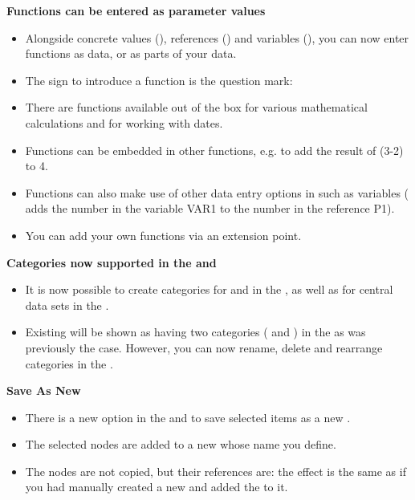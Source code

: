 \textbf{Functions can be entered as parameter values}
\begin{itemize}
\item Alongside concrete values (), references () and variables (), you can now enter functions as data, or as parts of your data.
\item The sign to introduce a function is the question mark: 
\item There are functions available out of the box for various mathematical calculations and for working with dates.  
\item Functions can be embedded in other functions, e.g.  to add the result of (3-2) to 4. 
\item Functions can also make use of other data entry options in \app{} such as variables ( adds the number in the variable VAR1 to the number in the reference P1). 
\item You can add your own functions via an extension point. 
\end{itemize}

\textbf{Categories now supported in the \gdtestsuitebrowser{} and \gddataeditor}\\
\begin{itemize}
\item It is now possible to create categories for \gdsuites{} and \gdjobs{} in the \gdtestsuitebrowser{}, as well as for central data sets in the \gddataeditor{}. 
\item Existing \gdprojects{} will be shown as having two categories ( and ) in the \gdtestsuitebrowser{} as was previously the case. However, you can now rename, delete and rearrange categories in the \gdtestsuitebrowser{}. 
\end{itemize} 


\textbf{Save As New \gdcase{}}
\begin{itemize}
\item There is a new option in the \gdtestcaseeditor{} and \gdtestsuiteeditor{} to save selected items as a new \gdcase{}.
\item The selected nodes are added to a new \gdcase{} whose name you define.
\item The nodes are not copied, but their references are: the effect is the same as if you had manually created a new \gdcase{} and added the \gdcases{} to it. 
\end{itemize}

